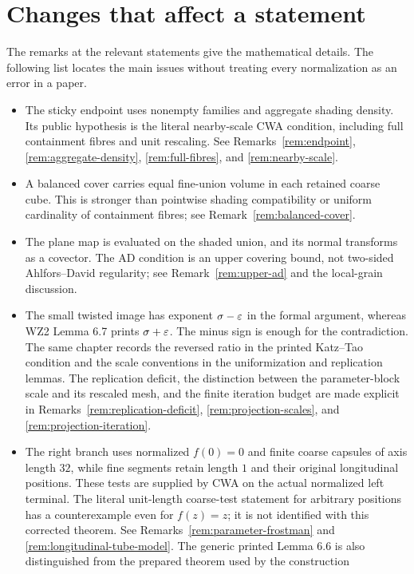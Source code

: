 \section{Changes that affect a statement}

The remarks at the relevant statements give the mathematical details.
The following list locates the main issues without treating every
normalization as an error in a paper.

\begin{itemize}
\item The sticky endpoint uses nonempty families and aggregate shading
density. Its public hypothesis is the literal nearby-scale CWA
condition, including full containment fibres and unit rescaling.
See Remarks~\ref{rem:endpoint}, \ref{rem:aggregate-density},
\ref{rem:full-fibres}, and \ref{rem:nearby-scale}.
\item A balanced cover carries equal fine-union volume in each retained
coarse cube. This is stronger than pointwise shading compatibility or
uniform cardinality of containment fibres; see
Remark~\ref{rem:balanced-cover}.
\item The plane map is evaluated on the shaded union, and its normal
transforms as a covector. The AD condition is an upper covering bound,
not two-sided Ahlfors--David regularity; see
Remark~\ref{rem:upper-ad} and the local-grain discussion.
\item The small twisted image has exponent $\sigma-\varepsilon$ in the
formal argument, whereas WZ2 Lemma 6.7 prints $\sigma+\varepsilon$.
The minus sign is enough for the contradiction. The same chapter
records the reversed ratio in the printed Katz--Tao condition and
the scale conventions in the uniformization and replication lemmas.
The replication deficit, the distinction between the parameter-block
scale and its rescaled mesh, and the finite iteration budget are made
explicit in Remarks~\ref{rem:replication-deficit},
\ref{rem:projection-scales}, and \ref{rem:projection-iteration}.
\item The right branch uses normalized $f(0)=0$ and finite coarse
capsules of axis length $32$, while fine segments retain length $1$
and their original longitudinal positions. These tests are supplied
by CWA on the actual normalized left terminal. The literal unit-length
coarse-test statement for arbitrary positions has a counterexample
even for $f(z)=z$; it is not identified with this corrected theorem.
See Remarks~\ref{rem:parameter-frostman} and
\ref{rem:longitudinal-tube-model}. The generic printed Lemma 6.6 is
also distinguished from the prepared theorem used by the construction

\end{itemize}
